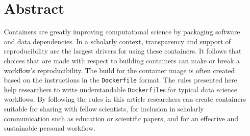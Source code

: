\documentclass[10pt,letterpaper]{article}
\newcommand{\getIndex}[2]{
  \ForEach{,}{\IfEq{#1}{\thislevelitem}{\number\thislevelcount\ExitForEach}{}}{#2}
}
\newcommand{\getAff}[1]{
  \getIndex{#1}{}
}
\begin{document}
\vspace*{0.2in}

\section*{Abstract}
Containers are greatly improving computational science by packaging
software and data dependencies. In a scholarly context, transparency and
support of reproducibility are the largest drivers for using these
containers. It follows that choices that are made with respect to
building containers can make or break a workflow's reproducibility. The
build for the container image is often created based on the instructions
in the \texttt{Dockerfile} format. The rules presented here help
researchers to write understandable \texttt{Dockerfile}s for typical
data science workflows. By following the rules in this article
researchers can create containers suitable for sharing with fellow
scientists, for inclusion in scholarly communication such as education
or scientific papers, and for an effective and sustainable personal
workflow.
\end{document}
